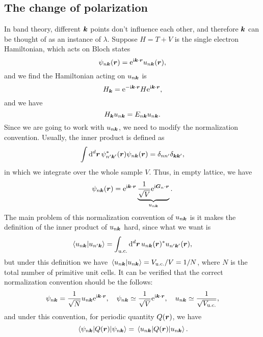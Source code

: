 \documentclass[hyperref, a4paper]{article}
\newcommand*{\ii}{\mathrm{i}}
\newcommand*{\ee}{\mathrm{e}}
\begin{document}
\subsection{The change of polarization}

In band theory, different $\vb*{k}$ points don't 
influence each other, 
and therefore $\vb*{k}$ can be thought of 
as an instance of $\lambda$.
Suppose $H = T + V$ is the single electron Hamiltonian,
which acts on Bloch states 
\begin{equation}
    \psi_{n \vb*{k}}(\vb*{r}) = \ee^{\ii \vb*{k} \cdot \vb*{r}} u_{n \vb*{k}}(\vb*{r}),
\end{equation}
and we find the Hamiltonian acting on $u_{n \vb*{k}}$ is 
\begin{equation}
    H_{\vb*{k}} = \ee^{- \ii \vb*{k} \cdot \vb*{r}} H \ee^{\ii \vb*{k} \cdot \vb*{r}},
\end{equation}
and we have 
\begin{equation}
    H_{\vb*{k}} u_{n \vb*{k}} = E_{n \vb*{k}} u_{n \vb*{k}}.
\end{equation}
Since we are going to work with $u_{n \vb*{k}}$, 
we need to modify the normalization convention.
Usually, the inner product is defined as 
\begin{equation}
    \int \dd[d]{\vb*{r}} \psi^*_{n' \vb*{k}'}(\vb*{r}) \psi_{n \vb*{k}}(\vb*{r})
    = \delta_{n n'} \delta_{\vb*{k} \vb*{k}'},
\end{equation}
in which we integrate over the whole sample $V$.
Thus, in empty lattice, we have 
\begin{equation}
    \psi_{n \vb*{k}}(\vb*{r}) = \ee^{\ii \vb*{k} \cdot \vb*{r}}
    \underbrace{
        \frac{1}{\sqrt{V}} \ee^{\ii \vb*{G}_n \cdot \vb*{r}}
    }_{u_{n \vb*{k}}}.
\end{equation}
The main problem of this normalization convention of $u_{n \vb*{k}}$ is 
it makes the definition of the inner product of $u_{n \vb*{k}}$ hard, 
since what we want is 
\begin{equation}
    \braket{u_{n \vb*{k}}}{u_{n' \vb*{k}}}
    = \int_{\text{u.c.}} \dd[d]{\vb*{r}} u_{n \vb*{k}}(\vb*{r})^* u_{n' \vb*{k}'}(\vb*{r}),
\end{equation}
but under this definition we have 
$\braket*{u_{n \vb*{k}}}{u_{n \vb*{k}}} = V_{\text{u.c.}} / V = 1 / N$,
where $N$ is the total number of primitive unit cells. 
It can be verified that the correct normalization convention 
should be the follows: 
\begin{equation}
    \psi_{n \vb*{k}} = \frac{1}{\sqrt{N}} u_{n \vb*{k}} \ee^{\ii \vb*{k} \cdot \vb*{r}}, \quad 
    \psi_{n \vb*{k}} \simeq \frac{1}{\sqrt{V}} \ee^{\ii \vb*{k} \cdot \vb*{r}}, \quad 
    u_{n \vb*{k}} \simeq \frac{1}{\sqrt{V_{\text{u.c.}}}},
\end{equation}
and under this convention, for periodic quantity $Q(\vb*{r})$,
we have 
\begin{equation}
    \expval{Q(\vb*{r})}{\psi_{n \vb*{k}}} = \expval{Q(\vb*{r})}{u_{n \vb*{k}}}.
    \label{eq:periodic-from-psi-to-u}
\end{equation}
\end{document}
